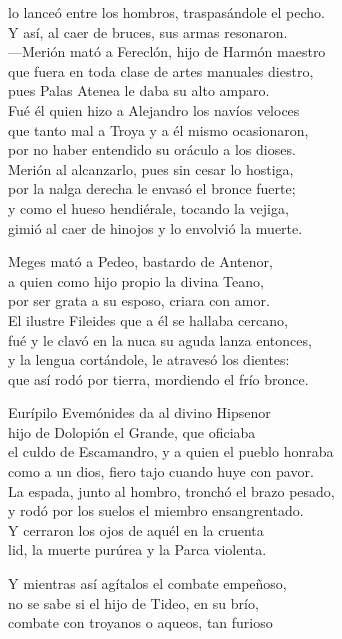 lo lanceó entre los hombros, traspasándole el pecho.\\
Y así, al caer de bruces, sus armas resonaron.\\
---Merión mató a Fereclón, hijo de Harmón maestro\\
que fuera en toda clase de artes manuales diestro,\\
pues Palas Atenea le daba su alto amparo.\\
Fué él quien hizo a Alejandro los navíos veloces\\
que tanto mal a Troya y a él mismo ocasionaron,\\
por no haber entendido su oráculo a los dioses.\\
Merión al alcanzarlo, pues sin cesar lo hostiga,\\
por la nalga derecha le envasó el bronce fuerte;\\
y como el hueso hendiérale, tocando la vejiga,\\
gimió al caer de hinojos y lo envolvió la muerte.\par
Meges mató a Pedeo, bastardo de Antenor,\\
a quien como hijo propio la divina Teano,\\
por ser grata a su esposo, criara con amor.\\
El ilustre Fileides que a él se hallaba cercano,\\
fué y le clavó en la nuca su aguda lanza entonces,\\
y la lengua cortándole, le atravesó los dientes:\\
que así rodó por tierra, mordiendo el frío bronce.\par
Eurípilo Evemónides da al divino Hipsenor\\
hijo de Dolopión el Grande, que oficiaba\\
el culdo de Escamandro, y a quien el pueblo honraba\\
como a un dios, fiero tajo cuando huye con pavor.\\
La espada, junto al hombro, tronchó el brazo pesado,\\
y rodó por los suelos el miembro ensangrentado.\\
Y cerraron los ojos de aquél en la cruenta\\
lid, la muerte purúrea y la Parca violenta.\par
Y mientras así agítalos el combate empeñoso,\\
no se sabe si el hijo de Tideo, en su brío,\\
combate con troyanos o aqueos, tan furioso\\
